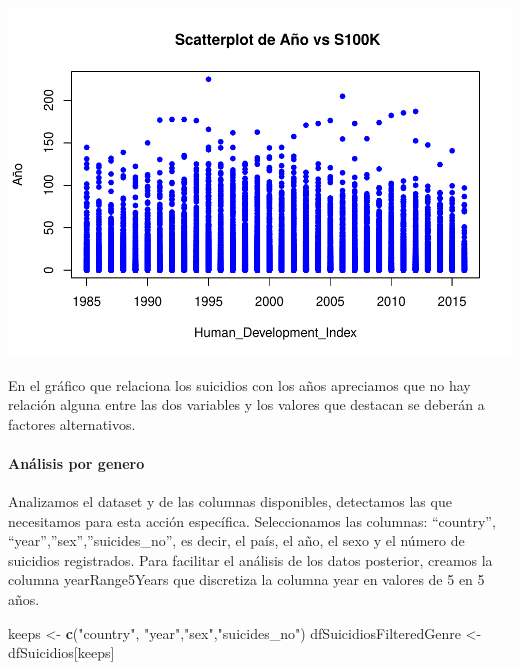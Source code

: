 \documentclass[]{article}
\newenvironment{Shaded}{\begin{snugshade}}{\end{snugshade}}
\newcommand{\DecValTok}[1]{\textcolor[rgb]{0.00,0.00,0.81}{#1}}
\newcommand{\KeywordTok}[1]{\textcolor[rgb]{0.13,0.29,0.53}{\textbf{#1}}}
\newcommand{\NormalTok}[1]{#1}
\newcommand{\OperatorTok}[1]{\textcolor[rgb]{0.81,0.36,0.00}{\textbf{#1}}}
\newcommand{\StringTok}[1]{\textcolor[rgb]{0.31,0.60,0.02}{#1}}
\let\oldparagraph\paragraph
\renewcommand{\paragraph}[1]{\oldparagraph{#1}\mbox{}}
\begin{document}
\includegraphics{Informe_files/figure-latex/unnamed-chunk-22-1.pdf}

En el gráfico que relaciona los suicidios con los años apreciamos que no
hay relación alguna entre las dos variables y los valores que destacan
se deberán a factores alternativos.

\hypertarget{analisis-por-genero}{%
\paragraph{Análisis por genero}\label{analisis-por-genero}}

Analizamos el dataset y de las columnas disponibles, detectamos las que
necesitamos para esta acción especíﬁca. Seleccionamos las columnas:
``country'', ``year'',''sex'',''suicides\_no'', es decir, el país, el
año, el sexo y el número de suicidios registrados. Para facilitar el
análisis de los datos posterior, creamos la columna yearRange5Years que
discretiza la columna year en valores de 5 en 5 años.

\begin{Shaded}
\begin{Highlighting}[]
\NormalTok{keeps <-}\StringTok{ }\KeywordTok{c}\NormalTok{(}\StringTok{"country"}\NormalTok{, }\StringTok{"year"}\NormalTok{,}\StringTok{"sex"}\NormalTok{,}\StringTok{"suicides_no"}\NormalTok{)}
\NormalTok{dfSuicidiosFilteredGenre <-}\StringTok{ }\NormalTok{dfSuicidios[keeps]}
\end{Highlighting}
\end{Shaded}

\begin{Shaded}
\end{Shaded}
\end{document}
